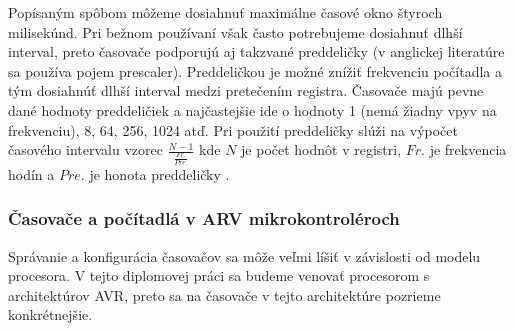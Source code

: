 Popísaným spôbom môžeme dosiahnuť maximálne časové okno štyroch milisekúnd. Pri
bežnom používaní však často potrebujeme dosiahnuť dlhší interval, preto časovače
podporujú aj takzvané preddeličky (v anglickej literatúre sa používa pojem prescaler). Preddeličkou je možné znížiť frekvenciu počítadla a tým dosiahnúť dlhší interval medzi pretečením registra. Časovače majú pevne dané hodnoty preddeličiek a
najčastejšie ide o hodnoty 1 (nemá žiadny vpyv na frekvenciu), 8, 64, 256, 1024 atď. Pri použití preddeličky slúži na výpočet časového intervalu vzorec $\frac{N-1}{\frac{Fr.}{Pre.}}$ kde $N$ je počet hodnôt v registri, $Fr.$ je frekvencia hodín a $Pre.$ je honota preddeličky \cite{ElectronicBasics30}.

\subsubsection{Časovače a počítadlá v ARV mikrokontroléroch}
\noindent
Správanie a konfigurácia časovačov sa môže veľmi líšiť v závislosti od modelu procesora. V tejto diplomovej práci sa budeme venovať procesorom s architektúrov AVR, preto sa na časovače v tejto architektúre pozrieme konkrétnejšie.